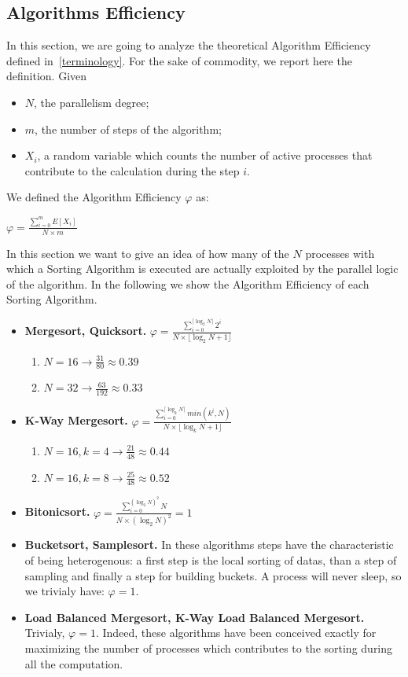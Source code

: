 \subsection{Algorithms Efficiency}
In this section, we are going to analyze the theoretical Algorithm Efficiency defined in~\ref{terminology}. For the sake of commodity, we report here the definition. Given
\begin{itemize}
\item $N$, the parallelism degree; 
\item $m$, the number of steps of the algorithm;
\item $X_i$, a random variable which counts the number of active processes that contribute to the calculation during the step $i$.
\end{itemize}
We defined the Algorithm Efficiency $\varphi$ as:
\begin{center}
$\varphi = \frac{\sum_{i=0}^m E[X_i]}{N \times m} $
\end{center}
In this section we want to give an idea of how many of the $N$ processes with which a Sorting Algorithm is executed are actually exploited by the parallel logic of the algorithm. In the following we show the Algorithm Efficiency of each Sorting Algorithm.

\begin{itemize}
\item \textbf{Mergesort, Quicksort.} $\varphi = \frac{\sum_{i=0}^{ \lceil \log_2{N} \rceil} 2^i}{N \times \lfloor \log_2{N} + 1 \rfloor} $
\begin{enumerate}
\item $N = 16 \rightarrow \frac{31}{80} \approx 0.39$
\item $N = 32 \rightarrow \frac{63}{192} \approx 0.33$
\end{enumerate}

\item \textbf{K-Way Mergesort.} $\varphi = \frac{\sum_{i=0}^{ \lceil \log_k{N} \rceil} min ( k^i, N )}{N \times \lfloor \log_k{N} + 1 \rfloor } $
\begin{enumerate}
\item $N = 16, k = 4 \rightarrow \frac{21}{48} \approx 0.44$
\item $N = 16, k = 8 \rightarrow \frac{25}{48} \approx 0.52$
\end{enumerate}

\item \textbf{Bitonicsort.} $\varphi = \frac{\sum_{i=0}^{(\log_2{N})^2} N}{N \times (\log_2{N})^2} = 1 $
\item \textbf{Bucketsort, Samplesort.} In these algorithms steps have the characteristic of being heterogenous: a first step is the local sorting of datas, than a step of sampling and finally a step for building buckets. A process will never sleep, so we trivialy have: $\varphi = 1$.

\item \textbf{Load Balanced Mergesort, K-Way Load Balanced Mergesort.} Trivialy, $\varphi = 1$. Indeed, these algorithms have been conceived exactly for maximizing the number of processes which contributes to the sorting during all the computation.

\end{itemize}
